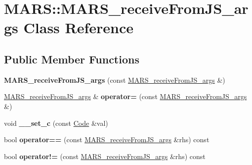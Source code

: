 \hypertarget{classMARS_1_1MARS__receiveFromJS__args}{}\section{M\+A\+RS\+:\+:M\+A\+R\+S\+\_\+receive\+From\+J\+S\+\_\+args Class Reference}
\label{classMARS_1_1MARS__receiveFromJS__args}
\subsection*{Public Member Functions}
\begin{DoxyCompactItemize}
\item 
\mbox{\label{classMARS_1_1MARS__receiveFromJS__args_ad3d7187eea7e5d2c6cc5f150a308d8f0}} 
{\bfseries M\+A\+R\+S\+\_\+receive\+From\+J\+S\+\_\+args} (const \hyperlink{classMARS_1_1MARS__receiveFromJS__args}{M\+A\+R\+S\+\_\+receive\+From\+J\+S\+\_\+args} \&)
\item 
\mbox{\label{classMARS_1_1MARS__receiveFromJS__args_a4a430ee1811ddead19ae56f94425e1c9}} 
\hyperlink{classMARS_1_1MARS__receiveFromJS__args}{M\+A\+R\+S\+\_\+receive\+From\+J\+S\+\_\+args} \& {\bfseries operator=} (const \hyperlink{classMARS_1_1MARS__receiveFromJS__args}{M\+A\+R\+S\+\_\+receive\+From\+J\+S\+\_\+args} \&)
\item 
\mbox{\label{classMARS_1_1MARS__receiveFromJS__args_a87f8b675b6704fe531f6e2ed14bc27a2}} 
void {\bfseries \+\_\+\+\_\+set\+\_\+c} (const \hyperlink{classMARS_1_1Code}{Code} \&val)
\item 
\mbox{\label{classMARS_1_1MARS__receiveFromJS__args_af3f8cc6baf75a8e6333fb437d900932c}} 
bool {\bfseries operator==} (const \hyperlink{classMARS_1_1MARS__receiveFromJS__args}{M\+A\+R\+S\+\_\+receive\+From\+J\+S\+\_\+args} \&rhs) const
\item 
\mbox{\label{classMARS_1_1MARS__receiveFromJS__args_ace32f0de994095f0012893161e66cc69}} 
bool {\bfseries operator!=} (const \hyperlink{classMARS_1_1MARS__receiveFromJS__args}{M\+A\+R\+S\+\_\+receive\+From\+J\+S\+\_\+args} \&rhs) const

\end{DoxyCompactItemize}
